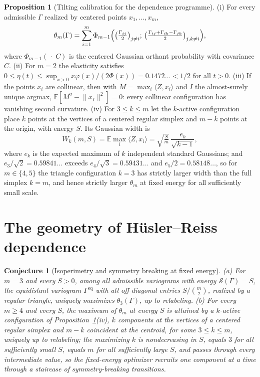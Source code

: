 \documentclass[11pt]{article}
\newtheorem{conjecture}{Conjecture}
\theoremstyle{definition}
\newcommand{\E}{\mathbb E}
\providecommand{\E}{\mathbb E}
\newtheorem{proposition}{Proposition}
\begin{document}
\begin{proposition}[Tilting calibration for the dependence programme]\label{ah:hr}
(i) For every admissible $\Gamma$ realized by centered points $x_1,\ldots,x_m$,
\[
\theta_m(\Gamma)=\sum_{i=1}^m\Phi_{m-1}\Bigl(\bigl(\tfrac{\Gamma_{ij}}2\bigr)_{j\ne i};\,\bigl(\tfrac{\Gamma_{ij}+\Gamma_{ik}-\Gamma_{jk}}2\bigr)_{j,k\ne i}\Bigr),
\]
where $\Phi_{m-1}(\,\cdot\;C)$ is the centered Gaussian orthant probability with covariance $C$.  (ii) For $m=2$ the elasticity satisfies $0\le\eta(t)\le\sup_{x>0}x\varphi(x)/(2\Phi(x))=0.1472\ldots<1/2$ for all $t>0$.  (iii) If the points $x_i$ are collinear, then with $M=\max_i\langle Z,x_i\rangle$ and $I$ the almost-surely unique argmax, $\E[M^2-\lVert x_I\rVert^2]=0$: every collinear configuration has vanishing second curvature.  (iv) For $3\le k\le m$ let the $k$-active configuration place $k$ points at the vertices of a centered regular simplex and $m-k$ points at the origin, with energy $S$.  Its Gaussian width is
\[
W_k(m,S)=\E\max_i\langle Z,x_i\rangle=\sqrt{\tfrac Sm}\,\frac{e_k}{\sqrt{k-1}},
\]
where $e_k$ is the expected maximum of $k$ independent standard Gaussians; and $e_3/\sqrt2=0.59841\ldots$ exceeds $e_4/\sqrt3=0.59431\ldots$ and $e_5/2=0.58148\ldots$, so for $m\in\{4,5\}$ the triangle configuration $k=3$ has strictly larger width than the full simplex $k=m$, and hence strictly larger $\theta_m$ at fixed energy for all sufficiently small scale.
\end{proposition}

\section{The geometry of H\"usler--Reiss dependence}

\begin{conjecture}[Isoperimetry and symmetry breaking at fixed energy]\label{ah1}
(a) For $m=3$ and every $S>0$, among all admissible variograms with energy $\mathcal S(\Gamma)=S$, the equidistant variogram $\Gamma^{\mathrm{eq}}$ with all off-diagonal entries $S/\binom m2$, realized by a regular triangle, uniquely maximizes $\theta_3(\Gamma)$, up to relabeling.  (b) For every $m\ge4$ and every $S$, the maximum of $\theta_m$ at energy $S$ is attained by a $k$-active configuration of Proposition~\ref{ah:hr}(iv), $k$ components at the vertices of a centered regular simplex and $m-k$ coincident at the centroid, for some $3\le k\le m$, uniquely up to relabeling; the maximizing $k$ is nondecreasing in $S$, equals $3$ for all sufficiently small $S$, equals $m$ for all sufficiently large $S$, and passes through every intermediate value, so the fixed-energy optimizer recruits one component at a time through a staircase of symmetry-breaking transitions.
\end{conjecture}
\end{document}
